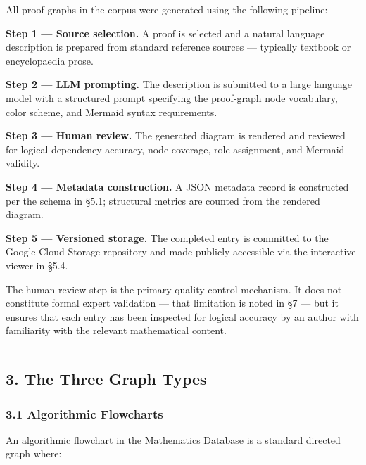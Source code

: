 \documentclass[
  11pt]{article}
\begin{document}
All proof graphs in the corpus were generated using the following
pipeline:

\textbf{Step 1 --- Source selection.} A proof is selected and a natural
language description is prepared from standard reference sources ---
typically textbook or encyclopaedia prose.

\textbf{Step 2 --- LLM prompting.} The description is submitted to a
large language model with a structured prompt specifying the proof-graph
node vocabulary, color scheme, and Mermaid syntax requirements.

\textbf{Step 3 --- Human review.} The generated diagram is rendered and
reviewed for logical dependency accuracy, node coverage, role
assignment, and Mermaid validity.

\textbf{Step 4 --- Metadata construction.} A JSON metadata record is
constructed per the schema in §5.1; structural metrics are counted from
the rendered diagram.

\textbf{Step 5 --- Versioned storage.} The completed entry is committed
to the Google Cloud Storage repository and made publicly accessible via
the interactive viewer in §5.4.

The human review step is the primary quality control mechanism. It does
not constitute formal expert validation --- that limitation is noted in
§7 --- but it ensures that each entry has been inspected for logical
accuracy by an author with familiarity with the relevant mathematical
content.

\begin{center}\rule{0.5\linewidth}{0.5pt}\end{center}

\hypertarget{3-the-three-graph-types}{%
\subsection{3. The Three Graph Types}\label{3-the-three-graph-types}}

\hypertarget{31-algorithmic-flowcharts}{%
\subsubsection{3.1 Algorithmic
Flowcharts}\label{31-algorithmic-flowcharts}}

An algorithmic flowchart in the Mathematics Database is a standard
directed graph where:
\end{document}
